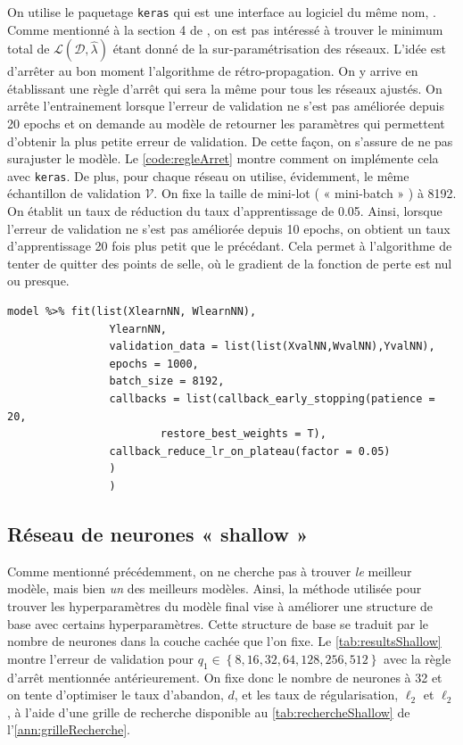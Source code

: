 On utilise le paquetage \verb=keras= qui est une interface au logiciel du même nom, \citep{keras}.
Comme mentionné à la section 4 de \citet{ferrario2018insights}, on est pas intéressé à trouver le minimum total de $\mathcal{L}(\mathcal{D}, \hat{\lambda})$ étant donné de la sur-paramétrisation des réseaux. L'idée est d'arrêter au bon moment l'algorithme de rétro-propagation. On y arrive en établissant une règle d'arrêt qui sera la même pour tous les réseaux ajustés. On arrête l'entrainement lorsque l'erreur de validation ne s'est pas améliorée depuis 20 epochs et on demande au modèle de retourner les paramètres qui permettent d'obtenir la plus petite erreur de validation. De cette façon, on s'assure de ne pas surajuster le modèle. Le \autoref{code:regleArret} montre comment on implémente cela avec \verb=keras=. De plus, pour chaque réseau on utilise, évidemment, le même échantillon de validation $\mathcal{V}$. On fixe la taille de mini-lot ( « mini-batch » ) à 8192. On établit un taux de réduction du taux d'apprentissage de 0.05. Ainsi, lorsque l'erreur de validation ne s'est pas améliorée depuis 10 epochs, on obtient un taux d'apprentissage 20 fois plus petit que le précédant. Cela permet à l'algorithme de tenter de quitter des points de selle, où le gradient de la fonction de perte est nul ou presque.%


\begin{lstlisting}[caption= {Définition des paramètres de l'algorithme},label=code:regleArret]
	model %>% fit(list(XlearnNN, WlearnNN), 
              	YlearnNN,
              	validation_data = list(list(XvalNN,WvalNN),YvalNN),
              	epochs = 1000, 
              	batch_size = 8192,
              	callbacks = list(callback_early_stopping(patience = 20, 
              			restore_best_weights = T),
              	callback_reduce_lr_on_plateau(factor = 0.05)
              	)
              	)
\end{lstlisting}



\subsection{Réseau de neurones « shallow »}
\label{subsec:Shallow}

Comme mentionné précédemment, on ne cherche pas à trouver \emph{le} meilleur modèle, mais bien \emph{un} des meilleurs modèles. Ainsi, la méthode utilisée pour trouver les hyperparamètres du modèle final vise à améliorer une structure de base avec certains hyperparamètres. Cette structure de base se traduit par le nombre de neurones dans la couche cachée que l'on fixe. Le \autoref{tab:resultsShallow} montre l'erreur de validation pour $q_1 \in \left\{8, 16, 32, 64, 128 ,256 ,512\right\}$ avec la règle d'arrêt mentionnée antérieurement. On fixe donc le nombre de neurones à 32 et on tente d'optimiser le taux d'abandon, $d$, et les taux de régularisation, $\ell_2$ et $\ell_2$, à l'aide d'une grille de recherche disponible au \autoref{tab:rechercheShallow} de l'\autoref{ann:grilleRecherche}.

